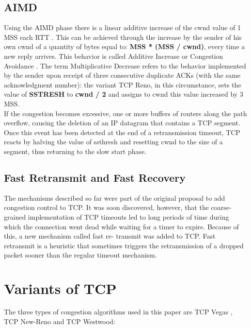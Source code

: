 {\subsection{\normalsize AIMD}{
Using the AIMD phase there is a linear additive increase of the cwnd value of 1 MSS each RTT . This can be achieved through the increase by the sender of his own cwnd of a quantity of bytes equal to:
\textbf{MSS * (MSS / cwnd)}, every time a new reply arrives. This behavior is called Additive Increase or Congestion Avoidance . The term Multiplicative Decrease refers to the behavior implemented by the sender upon receipt of three consecutive duplicate ACKs (with the same acknowledgment number): the variant TCP Reno, in this circumstance, sets the value of \textbf{SSTRESH} to \textbf{cwnd / 2} and assigns to cwnd this value increased by 3 MSS.\\ If the congestion becomes excessive, one or more buffers of routers along the path overflow, causing the deletion of an IP datagram that contains a TCP segment. Once this event has been detected at the end of a retransmission timeout, TCP reacts by halving the value of ssthresh and resetting cwnd to the size of a segment, thus returning to the slow start phase.
}
\subsection{\normalsize Fast Retransmit and Fast Recovery}{
The mechanisms described so far were part of the original proposal to add congestion control to TCP. It was soon discovered, however, that the coarse-grained implementation of TCP timeouts led to long periods of time during which the connection went dead while waiting for a timer to expire. Because of this, a new mechanism called fast re- transmit was added to TCP. Fast retransmit is a heuristic that sometimes triggers the retransmission of a dropped packet sooner than the regular timeout mechanism.
}

\section{\normalsize Variants of TCP}{
The three types of congestion algorithms used in this paper are TCP Vegas , TCP New-Reno and TCP Westwood:
}}
